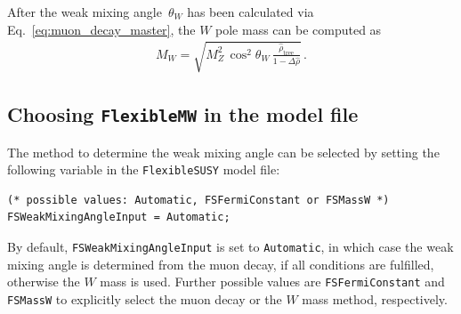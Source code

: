 \documentclass[final,3p,11pt,pdflatex]{elsarticle}
\makeatletter
\newcommand{\fs}{\texttt{FlexibleSUSY}\@\xspace}
\newcommand{\fmw}{\texttt{FlexibleMW}\@\xspace}
\newcommand{\code}[1]{\lstinline|#1|}  %
\makeatother
\begin{document}
After the weak mixing angle~$\theta_W$ has been calculated via
Eq.~\eqref{eq:muon_decay_master}, the $W$ pole mass can be
computed as
%
\begin{align}
   M_W = \sqrt{M_Z^2\,\cos^2\theta_W\,\frac{\hat\rho_\text{tree}}{1-\Delta\hat\rho}}\,.
   \label{eq:MW_calculation}
\end{align}
%

\subsection{Choosing \fmw in the model file}
%
The method to determine the weak mixing angle can be selected by
setting the following variable in the \fs model file:
%
\begin{lstlisting}
(* possible values: Automatic, FSFermiConstant or FSMassW *)
FSWeakMixingAngleInput = Automatic;
\end{lstlisting}
%
By default, \code{FSWeakMixingAngleInput} is set to \code{Automatic},
in which case the weak mixing angle is determined from the muon decay,
if all conditions are fulfilled, otherwise the $W$ mass is used.
Further possible values are \code{FSFermiConstant} and
\code{FSMassW} to explicitly select the muon decay or the $W$ mass method,
respectively.
\end{document}
